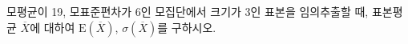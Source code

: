 모평균이 19, 모표준편차가 6인 모집단에서 크기가 3인 표본을 임의추출할 때, 표본평균 $\overline{X}$에 대하여 $\mathrm{E}(\overline{X})$, $\sigma(\overline{X})$를 구하시오.
